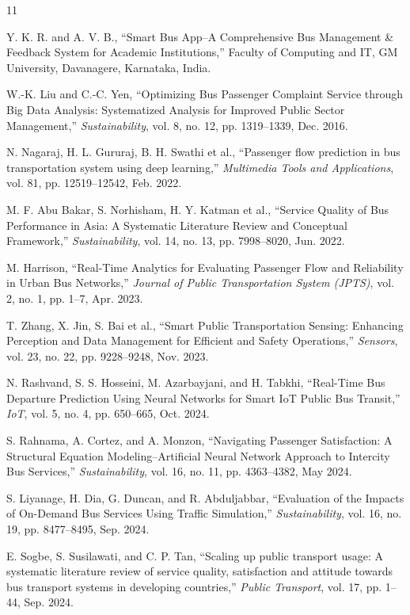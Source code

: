 \documentclass[conference]{IEEEtran}
\begin{document}
\begin{thebibliography}{11}

Y. K. R. and A. V. B., “Smart Bus App–A Comprehensive Bus Management \& Feedback System for Academic Institutions,” Faculty of Computing and IT, GM University, Davanagere, Karnataka, India.

W.-K. Liu and C.-C. Yen, “Optimizing Bus Passenger Complaint Service through Big Data Analysis: Systematized Analysis for Improved Public Sector Management,” \textit{Sustainability}, vol. 8, no. 12, pp. 1319–1339, Dec. 2016.

N. Nagaraj, H. L. Gururaj, B. H. Swathi et al., “Passenger flow prediction in bus transportation system using deep learning,” \textit{Multimedia Tools and Applications}, vol. 81, pp. 12519–12542, Feb. 2022.

M. F. Abu Bakar, S. Norhisham, H. Y. Katman et al., “Service Quality of Bus Performance in Asia: A Systematic Literature Review and Conceptual Framework,” \textit{Sustainability}, vol. 14, no. 13, pp. 7998–8020, Jun. 2022.

M. Harrison, “Real-Time Analytics for Evaluating Passenger Flow and Reliability in Urban Bus Networks,” \textit{Journal of Public Transportation System (JPTS)}, vol. 2, no. 1, pp. 1–7, Apr. 2023.

T. Zhang, X. Jin, S. Bai et al., “Smart Public Transportation Sensing: Enhancing Perception and Data Management for Efficient and Safety Operations,” \textit{Sensors}, vol. 23, no. 22, pp. 9228–9248, Nov. 2023.

N. Rashvand, S. S. Hosseini, M. Azarbayjani, and H. Tabkhi, “Real-Time Bus Departure Prediction Using Neural Networks for Smart IoT Public Bus Transit,” \textit{IoT}, vol. 5, no. 4, pp. 650–665, Oct. 2024.

S. Rahnama, A. Cortez, and A. Monzon, “Navigating Passenger Satisfaction: A Structural Equation Modeling–Artificial Neural Network Approach to Intercity Bus Services,” \textit{Sustainability}, vol. 16, no. 11, pp. 4363–4382, May 2024.

S. Liyanage, H. Dia, G. Duncan, and R. Abduljabbar, “Evaluation of the Impacts of On-Demand Bus Services Using Traffic Simulation,” \textit{Sustainability}, vol. 16, no. 19, pp. 8477–8495, Sep. 2024.

E. Sogbe, S. Susilawati, and C. P. Tan, “Scaling up public transport usage: A systematic literature review of service quality, satisfaction and attitude towards bus transport systems in developing countries,” \textit{Public Transport}, vol. 17, pp. 1–44, Sep. 2024.


\end{thebibliography}
\end{document}
